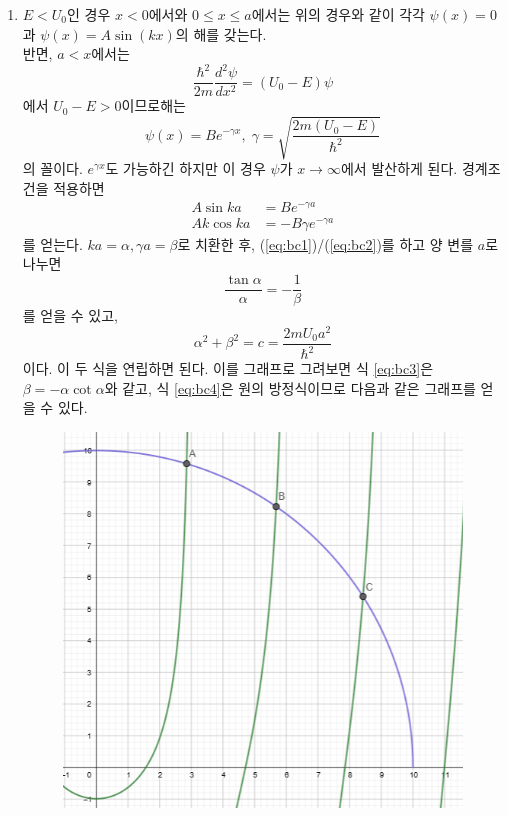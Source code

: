 \begin{enumerate}
\item $E<U_0$인 경우
$x<0$에서와 $0\le x \le a$에서는 위의 경우와 같이 각각 $\psi(x)=0$과 $\psi(x)=A\sin(kx)$의 해를 갖는다.\\
반면, $a<x$에서는
\begin{equation}
\frac{\hbar^2}{2m}\frac{d^2\psi}{dx^2}=(U_0-E)\psi
\end{equation}
에서 $U_0-E>0$이므로해는
\begin{equation}
    \psi(x)=Be^{-\gamma x},\; \gamma = \sqrt{\frac{2m(U_0-E)}{\hbar^2}}
\end{equation}
의 꼴이다. $e^{\gamma x}$도 가능하긴 하지만 이 경우 $\psi$가 $x\to \infty$에서 발산하게 된다. 경계조건을 적용하면
\begin{align}
    A\sin ka &= Be^{-\gamma a}\label{eq:bc1}\\
    Ak\cos ka &= -B\gamma e^{-\gamma a}\label{eq:bc2}
\end{align}
를 얻는다. $ka=\alpha, \gamma a=\beta$로 치환한 후,
(\ref{eq:bc1})/(\ref{eq:bc2})를 하고 양 변를 $a$로 나누면
\begin{equation}
    \frac{\tan\alpha}{\alpha}=-\frac{1}{\beta}\label{eq:bc3}
\end{equation}
를 얻을 수 있고, 
\begin{equation}
    \alpha^2+\beta^2 = c =\frac{2mU_0a^2}{\hbar^2}\label{eq:bc4}
\end{equation}
이다. 이 두 식을 연립하면 된다. 이를 그래프로 그려보면 식 \ref{eq:bc3}은 $\beta=-\alpha\cot \alpha$와 같고, 식 \ref{eq:bc4}은 원의 방정식이므로 다음과 같은 그래프를 얻을 수 있다.
\begin{figure}[h!]
\centering\includegraphics[scale=0.4]{Pictures/semiinfinite.PNG}

\end{figure}
\end{enumerate}
